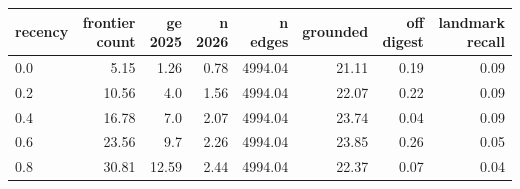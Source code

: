 \begin{tabular}{lrrrrrrr}
\toprule
recency & frontier count & ge 2025 & n 2026 & n edges & grounded & off digest & landmark recall \\
\midrule
0.0 & 5.15 & 1.26 & 0.78 & 4994.04 & 21.11 & 0.19 & 0.09 \\
0.2 & 10.56 & 4.0 & 1.56 & 4994.04 & 22.07 & 0.22 & 0.09 \\
0.4 & 16.78 & 7.0 & 2.07 & 4994.04 & 23.74 & 0.04 & 0.09 \\
0.6 & 23.56 & 9.7 & 2.26 & 4994.04 & 23.85 & 0.26 & 0.05 \\
0.8 & 30.81 & 12.59 & 2.44 & 4994.04 & 22.37 & 0.07 & 0.04 \\
\bottomrule
\end{tabular}
